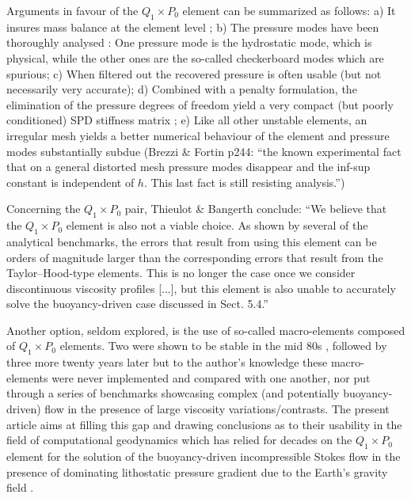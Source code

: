 \documentclass[a4paper,12pt]{article}
\begin{document}
Arguments in favour of the $Q_1\times P_0$ element can be summarized as follows:
a) It insures mass balance at the element level \cite[p459]{grsa};
b) The pressure modes have been thoroughly analysed \cite{sagl81a,sagl81b,grsi94}:
One pressure mode is the hydrostatic mode, which is  
physical, while the other ones are the so-called checkerboard modes which are spurious;
c) When filtered out \cite{chpc95} the recovered pressure is often usable (but not 
necessarily very accurate);
d) Combined with a penalty formulation, the elimination of the pressure degrees of freedom 
yield a very compact (but poorly conditioned) SPD stiffness matrix \cite{zigo75,hulb79,zina82,redd82,odks82};
e) Like all other unstable elements, an irregular mesh yields a 
better numerical behaviour of the element \cite{qizh07} and pressure modes substantially subdue
(Brezzi \& Fortin p244: ``the known experimental fact that on a general
distorted mesh pressure modes disappear and the inf-sup constant is independent of $h$. 
This last fact is still resisting analysis.'')

Concerning the $Q_1 \times P_0$ pair, Thieulot \& Bangerth \cite{thba22} conclude:
``We believe that the $Q_1 \times P_0$ element is also not a viable
choice. As shown by several of the analytical benchmarks, the errors that result from using this element can
be orders of magnitude larger than the corresponding
errors that result from the Taylor–Hood-type elements.
This is no longer the case once we consider discontinuous viscosity profiles [...], but this element
is also unable to accurately solve the buoyancy-driven
case discussed in Sect. 5.4.''

Another option, seldom explored, is the use of so-called macro-elements composed of $Q_1\times P_0$ elements. 
Two were shown to be stable in the mid 80s \cite{leta81,sten84}, followed by three more twenty years
later \cite{qizh07} but to the author's knowledge these macro-elements were never 
implemented and compared with one another, nor put through a series of benchmarks showcasing 
complex (and potentially buoyancy-driven) flow in the 
presence of large viscosity variations/contrasts. The present article aims at 
filling this gap and drawing conclusions as to their usability in 
the field of computational geodynamics which has relied for decades on the $Q_1\times P_0$ element for the 
solution of the buoyancy-driven incompressible Stokes flow in the presence of 
dominating lithostatic pressure gradient due to the Earth's gravity field \cite{full95,lumh24}.  
\end{document}
